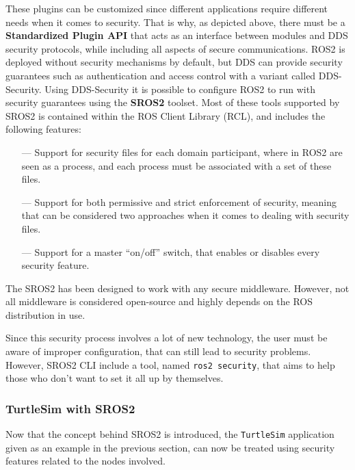 These plugins can be customized since different applications require different needs when it comes to security. That is why, as depicted above, there must be a \textbf{Standardized Plugin API} that acts as an interface between modules and DDS security protocols, while including all aspects of secure communications. 
ROS2 is deployed without security mechanisms by default, but DDS can provide security guarantees such as authentication and access control with a variant called DDS-Security. Using DDS-Security it is possible to configure ROS2 to run with security guarantees using the \textbf{SROS2} toolset. Most of these tools supported by SROS2 is contained within the ROS Client Library (RCL), and includes the following features:

\begin{itemize}
    \item[---] Support for security files for each domain participant, where in ROS2 are seen as a process, and each process must be associated with a set of these files.
    \item[---] Support for both permissive and strict enforcement of security, meaning that can be considered two approaches when it comes to dealing with security files.
    \item[---] Support for a master “on/off” switch, that enables or disables every security feature.
\end{itemize}

The SROS2 has been designed to work with any secure middleware. However, not all middleware is considered open-source and highly depends on the ROS distribution in use.

Since this security process involves a lot of new technology, the user must be aware of improper configuration, that can still lead to security problems. However, SROS2 CLI include a tool, named \texttt{ros2 security}, that aims to help those who don’t want to set it all up by themselves.

\subsubsection{TurtleSim with SROS2}
            
Now that the concept behind SROS2 is introduced, the \texttt{TurtleSim} application given as an example in the previous section, can now  be treated using security features related to the nodes involved.

